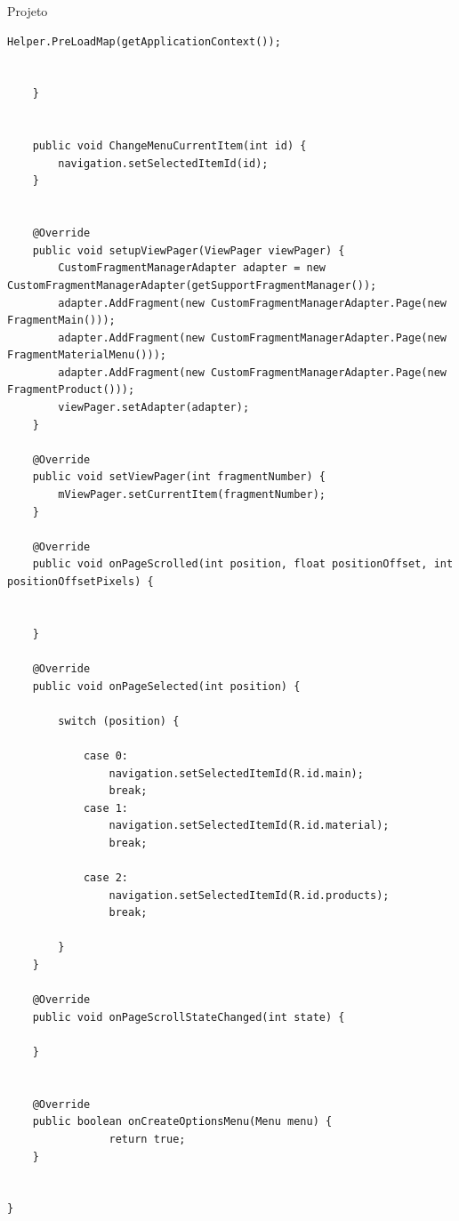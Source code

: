 \documentclass[
	12pt,				%
	openright,			%
	twoside,			%
	a4paper,			%
	english,			%
	french,				%
	spanish,			%
	brazil				%
	]{abntex2}
\begin{document}
\begin{chapter}{Projeto}
\begin{lstlisting}[numbers=none,
basicstyle=\small,
caption={MainActivity.java},
title={MainActivity.java},
label={MainActivity.java}]
        Helper.PreLoadMap(getApplicationContext());


    }


    public void ChangeMenuCurrentItem(int id) {
        navigation.setSelectedItemId(id);
    }


    @Override
    public void setupViewPager(ViewPager viewPager) {
        CustomFragmentManagerAdapter adapter = new CustomFragmentManagerAdapter(getSupportFragmentManager());
        adapter.AddFragment(new CustomFragmentManagerAdapter.Page(new FragmentMain()));
        adapter.AddFragment(new CustomFragmentManagerAdapter.Page(new FragmentMaterialMenu()));
        adapter.AddFragment(new CustomFragmentManagerAdapter.Page(new FragmentProduct()));
        viewPager.setAdapter(adapter);
    }

    @Override
    public void setViewPager(int fragmentNumber) {
        mViewPager.setCurrentItem(fragmentNumber);
    }

    @Override
    public void onPageScrolled(int position, float positionOffset, int positionOffsetPixels) {


    }

    @Override
    public void onPageSelected(int position) {

        switch (position) {

            case 0:
                navigation.setSelectedItemId(R.id.main);
                break;
            case 1:
                navigation.setSelectedItemId(R.id.material);
                break;

            case 2:
                navigation.setSelectedItemId(R.id.products);
                break;

        }
    }

    @Override
    public void onPageScrollStateChanged(int state) {

    }


    @Override
    public boolean onCreateOptionsMenu(Menu menu) {
                return true;
    }


}
\end{lstlisting}



\end{chapter}
\end{document}
